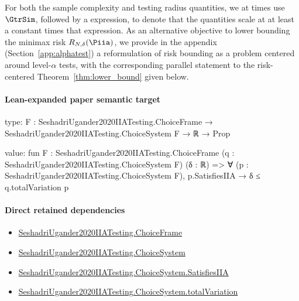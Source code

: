 \documentclass[10pt]{article}
\begin{document}
\begin{ReviewVerbatim}
	For both the sample complexity and testing radius quantities, we at times use $\GtrSim$, followed by a expression, to denote that the quantities scale at at least a constant times that expression. As an alternative objective to lower bounding the minimax risk $R_{N,\delta}(\Piia)$, we provide in the appendix (Section~\ref{app:alphatest}) a reformulation of risk bounding as a problem centered around level-$\alpha$ tests, with the corresponding parallel statement to the risk-centered Theorem~\ref{thm:lower_bound} given below.
\end{ReviewVerbatim}



\paragraph{Lean-expanded paper semantic target}
\begin{ReviewVerbatim}
type:
{F : SeshadriUgander2020IIATesting.ChoiceFrame} → SeshadriUgander2020IIATesting.ChoiceSystem F → ℝ → Prop

value:
fun {F : SeshadriUgander2020IIATesting.ChoiceFrame} (q : SeshadriUgander2020IIATesting.ChoiceSystem F) (δ : ℝ) =>
  ∀ (p : SeshadriUgander2020IIATesting.ChoiceSystem F), p.SatisfiesIIA → δ ≤ q.totalVariation p
\end{ReviewVerbatim}

\paragraph{Direct retained dependencies}
\begin{itemize}\raggedright
\item \hyperlink{paper-prerequisite-0b24d39c6f4d1898}{Seshadri\allowbreak{}Ugander2020\allowbreak{}IIA\allowbreak{}Testing.\allowbreak{}Choice\allowbreak{}Frame}
\item \hyperlink{paper-prerequisite-5dca52f4dfdd597a}{Seshadri\allowbreak{}Ugander2020\allowbreak{}IIA\allowbreak{}Testing.\allowbreak{}Choice\allowbreak{}System}
\item \hyperlink{paper-prerequisite-8641deb0e0512582}{Seshadri\allowbreak{}Ugander2020\allowbreak{}IIA\allowbreak{}Testing.\allowbreak{}Choice\allowbreak{}System.\allowbreak{}Satisfies\allowbreak{}IIA}
\item \hyperlink{paper-prerequisite-f9aa4f6576ac42f4}{Seshadri\allowbreak{}Ugander2020\allowbreak{}IIA\allowbreak{}Testing.\allowbreak{}Choice\allowbreak{}System.\allowbreak{}total\allowbreak{}Variation}
\end{itemize}
\end{document}
